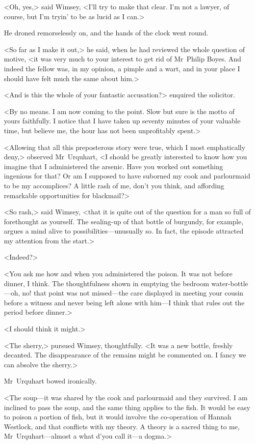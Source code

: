 <Oh, yes,> said Wimsey, <I'll try to make that clear. I'm not a lawyer, of course, but I'm tryin' to be as lucid as I can.>

He droned remorselessly on, and the hands of the clock went round.

<So far as I make it out,> he said, when he had reviewed the whole question of motive, <it was very much to your interest to get rid of Mr~Philip Boyes. And indeed the fellow was, in my opinion, a pimple and a wart, and in your place I should have felt much the same about him.>

<And is this the whole of your fantastic accusation?> enquired the solicitor.

<By no means. I am now coming to the point. Slow but sure is the motto of yours faithfully. I notice that I have taken up seventy minutes of your valuable time, but believe me, the hour has not been unprofitably spent.>

<Allowing that all this preposterous story were true, which I most emphatically deny,> observed Mr~Urquhart, <I should be greatly interested to know how you imagine that I administered the arsenic. Have you worked out something ingenious for that? Or am I supposed to have suborned my cook and parlourmaid to be my accomplices? A little rash of me, don't you think, and affording remarkable opportunities for blackmail?>

<So rash,> said Wimsey, <that it is quite out of the question for a man so full of forethought as yourself. The sealing-up of that bottle of burgundy, for example, argues a mind alive to possibilities—unusually so. In fact, the episode attracted my attention from the start.>

<Indeed?>

<You ask me how and when you administered the poison. It was not before dinner, I think. The thoughtfulness shown in emptying the bedroom water-bottle—oh, no! that point was not missed—the care displayed in meeting your cousin before a witness and never being left alone with him—I think that rules out the period before dinner.>

<I should think it might.>

<The sherry,> pursued Wimsey, thoughtfully. <It was a new bottle, freshly decanted. The disappearance of the remains might be commented on. I fancy we can absolve the sherry.>

Mr~Urquhart bowed ironically.

<The soup—it was shared by the cook and parlourmaid and they survived. I am inclined to pass the soup, and the same thing applies to the fish. It would be easy to poison a portion of fish, but it would involve the co-operation of Hannah Westlock, and that conflicts with my theory. A theory is a sacred thing to me, Mr~Urquhart—almost a what d'you call it—a dogma.>

